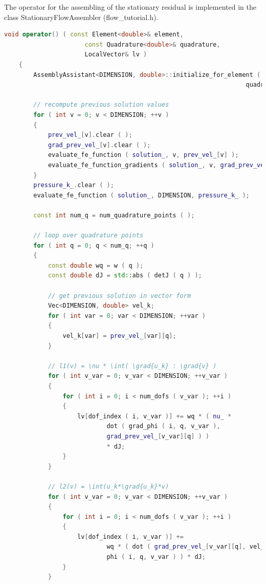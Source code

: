 \documentclass[a4paper, 11pt, twoside]{article}
\begin{document}
The operator for the assembling of the stationary residual is implemented in the class StationaryFlowAssembler (flow\_tutorial.h).

\begin{lstlisting}[language=C++, basicstyle={\footnotesize, \ttfamily}, keywordstyle=\color{blue}, numbers=none, tabsize=4]
    void operator() ( const Element<double>& element, 
                      const Quadrature<double>& quadrature,
                      LocalVector& lv )
    {
        AssemblyAssistant<DIMENSION, double>::initialize_for_element ( element, 
                                                                  quadrature );

        // recompute previous solution values
        for ( int v = 0; v < DIMENSION; ++v )
        {
            prev_vel_[v].clear ( );
            grad_prev_vel_[v].clear ( );
            evaluate_fe_function ( solution_, v, prev_vel_[v] );
            evaluate_fe_function_gradients ( solution_, v, grad_prev_vel_[v] );
        }
        pressure_k_.clear ( );
        evaluate_fe_function ( solution_, DIMENSION, pressure_k_ );

        const int num_q = num_quadrature_points ( );

        // loop over quadrature points
        for ( int q = 0; q < num_q; ++q )
        {
            const double wq = w ( q );
            const double dJ = std::abs ( detJ ( q ) );

            // get previous solution in vector form
            Vec<DIMENSION, double> vel_k;
            for ( int var = 0; var < DIMENSION; ++var )
            {
                vel_k[var] = prev_vel_[var][q];
            }

            // l1(v) = \nu * \int( \grad{u_k} : \grad{v} )
            for ( int v_var = 0; v_var < DIMENSION; ++v_var )
            {
                for ( int i = 0; i < num_dofs ( v_var ); ++i )
                {
                    lv[dof_index ( i, v_var )] += wq * ( nu_ * 
                            dot ( grad_phi ( i, q, v_var ), 
                            grad_prev_vel_[v_var][q] ) )
                            * dJ;
                }
            }

            // l2(v) = \int(u_k*\grad{u_k}*v)
            for ( int v_var = 0; v_var < DIMENSION; ++v_var )
            {
                for ( int i = 0; i < num_dofs ( v_var ); ++i )
                {
                    lv[dof_index ( i, v_var )] +=
                            wq * ( dot ( grad_prev_vel_[v_var][q], vel_k ) * 
                            phi ( i, q, v_var ) ) * dJ;
                }
            }


\end{lstlisting}
\end{document}
